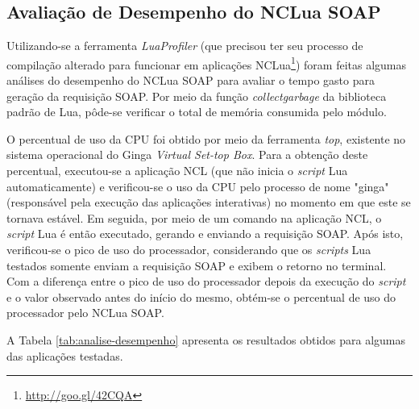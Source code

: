 \subsection{Avaliação de Desempenho do NCLua SOAP}

Utilizando-se a ferramenta \textit{LuaProfiler} (que precisou ter seu processo de compilação alterado para funcionar 
em aplicações NCLua\footnote{\url{http://goo.gl/42CQA}}) foram feitas algumas análises
do desempenho do NCLua SOAP para avaliar o tempo gasto para geração da requisição SOAP.
Por meio da função \textit{collectgarbage} da biblioteca padrão de Lua, pôde-se verificar
o total de memória consumida pelo módulo. 

O percentual de uso da CPU foi obtido por meio da ferramenta \textit{top}, existente no sistema
operacional do Ginga \textit{Virtual Set-top Box}. Para a obtenção deste percentual,
executou-se a aplicação NCL (que não inicia o \textit{script} Lua automaticamente) e 
verificou-se o uso da CPU pelo processo de nome "ginga" (responsável
pela execução das aplicações interativas) no momento em que este se tornava
estável. Em seguida, por meio de um comando na aplicação NCL,
o \textit{script} Lua é então executado, gerando e enviando a requisição SOAP.
Após isto, verificou-se o pico de uso do processador, considerando que
os \textit{scripts} Lua testados somente enviam a requisição SOAP e exibem o retorno no terminal.
Com a diferença entre o pico de uso do processador depois da execução do \textit{script}
e o valor observado antes do início do mesmo, obtém-se o percentual de uso do processador
pelo NCLua SOAP.

A Tabela \ref{tab:analise-desempenho} apresenta os resultados obtidos para algumas das aplicações testadas.

